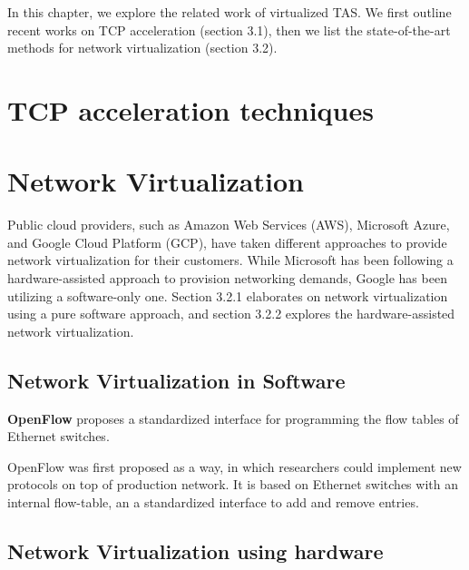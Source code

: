  In this chapter, we explore the related work of virtualized TAS. We first outline recent 
 works on TCP acceleration (section 3.1), then we list the state-of-the-art methods for network virtualization (section 3.2).



\section{TCP acceleration techniques}


\section{Network Virtualization}
Public cloud providers, such as Amazon Web Services (AWS), Microsoft Azure, and Google Cloud Platform (GCP), have taken different approaches to provide network virtualization for their customers. While Microsoft has been following a hardware-assisted approach to provision networking demands, Google has been utilizing a software-only one. Section 3.2.1 elaborates on network 
virtualization using a pure software approach, and section 3.2.2 explores the hardware-assisted network virtualization.


\subsection{Network Virtualization in Software}

\textbf{OpenFlow} proposes a standardized interface for programming the 
flow tables of Ethernet switches. 

OpenFlow was first proposed as a way, in which researchers could implement new protocols
on top of production network. It is based on Ethernet switches with an internal flow-table,
an a standardized interface to add and remove entries.






\subsection{Network Virtualization using hardware}
